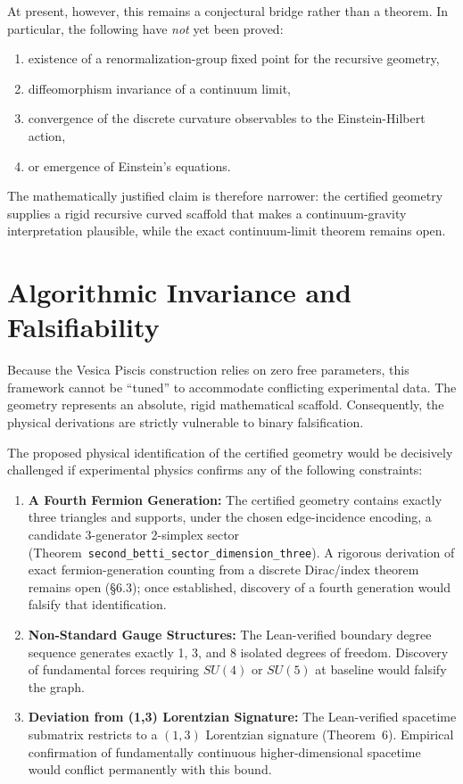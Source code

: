 \documentclass[12pt, a4paper]{article}
\begin{document}
At present, however, this remains a conjectural bridge rather than a theorem. In particular, the following have \emph{not} yet been proved:
\begin{enumerate}
    \item existence of a renormalization-group fixed point for the recursive geometry,
    \item diffeomorphism invariance of a continuum limit,
    \item convergence of the discrete curvature observables to the Einstein-Hilbert action,
    \item or emergence of Einstein's equations.
\end{enumerate}

The mathematically justified claim is therefore narrower: the certified geometry supplies a rigid recursive curved scaffold that makes a continuum-gravity interpretation plausible, while the exact continuum-limit theorem remains open.

\section{Algorithmic Invariance and Falsifiability}

Because the Vesica Piscis construction relies on zero free parameters, this framework cannot be ``tuned'' to accommodate conflicting experimental data. The geometry represents an absolute, rigid mathematical scaffold. Consequently, the physical derivations are strictly vulnerable to binary falsification. 

The proposed physical identification of the certified geometry would be decisively challenged if experimental physics confirms any of the following constraints:

\begin{enumerate}
    \item \textbf{A Fourth Fermion Generation:} The certified geometry contains exactly three triangles and supports, under the chosen edge-incidence encoding, a candidate 3-generator 2-simplex sector (Theorem~\texttt{second\_betti\_sector\_dimension\_three}). A rigorous derivation of exact fermion-generation counting from a discrete Dirac/index theorem remains open (\S6.3); once established, discovery of a fourth generation would falsify that identification.
    \item \textbf{Non-Standard Gauge Structures:} The Lean-verified boundary degree sequence generates exactly 1, 3, and 8 isolated degrees of freedom. Discovery of fundamental forces requiring $SU(4)$ or $SU(5)$ at baseline would falsify the graph.
    \item \textbf{Deviation from (1,3) Lorentzian Signature:} The Lean-verified spacetime submatrix restricts to a $(1,3)$ Lorentzian signature (Theorem~6). Empirical confirmation of fundamentally continuous higher-dimensional spacetime would conflict permanently with this bound.
\end{enumerate}
\end{document}
